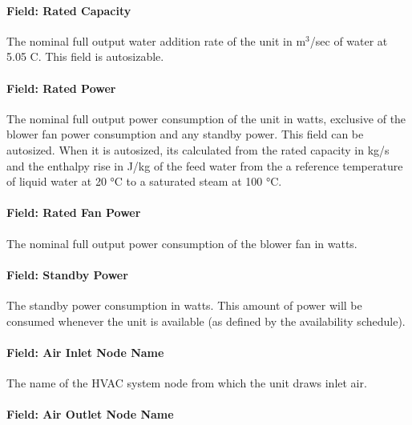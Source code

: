 \paragraph{Field: Rated Capacity}\label{field-rated-capacity-000}

The nominal full output water addition rate of the unit in m\(^{3}\)/sec of water at 5.05 C. This field is autosizable.

\paragraph{Field: Rated Power}\label{field-rated-power-000}

The nominal full output power consumption of the unit in watts, exclusive of the blower fan power consumption and any standby power. This field can be autosized. When it is autosized, its calculated from the rated capacity in kg/s and the enthalpy rise in J/kg of the feed water from the a reference temperature of liquid water at 20 °C to a saturated steam at 100 °C.

\paragraph{Field: Rated Fan Power}\label{field-rated-fan-power}

The nominal full output power consumption of the blower fan in watts.

\paragraph{Field: Standby Power}\label{field-standby-power-000}

The standby power consumption in watts. This amount of power will be consumed whenever the unit is available (as defined by the availability schedule).

\paragraph{Field: Air Inlet Node Name}\label{field-air-inlet-node-name-004}

The name of the HVAC system node from which the unit draws inlet air.

\paragraph{Field: Air Outlet Node Name}\label{field-air-outlet-node-name-004}

